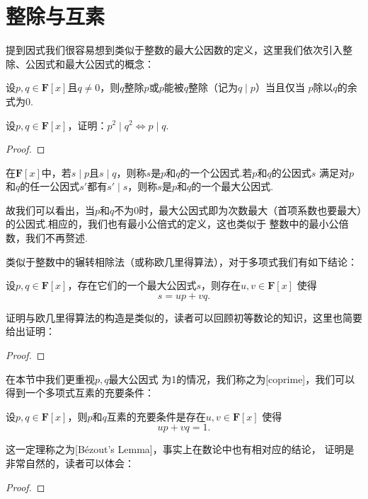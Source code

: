 \section{整除与互素}
提到因式我们很容易想到类似于整数的最大公因数的定义，这里我们依次引入整除、公因式和最大公因式的概念：
\begin{definition}
    设$p,q\in\mathbf{F}[x]$且$q\neq 0$，则$q$整除$p$或$p$能被$q$整除（记为$q \mid p$）当且仅当
    $p$除以$q$的余式为0.
\end{definition}
\begin{example}
    设$p,q\in\mathbf{F}[x]$，证明：$p^2 \mid q^2\iff p \mid q$.
\end{example}
\begin{proof}
    
\end{proof}

\begin{definition}
    在$\mathbf{F}[x]$中，若$s \mid p$且$s \mid q$，则称$s$是$p$和$q$的一个公因式.若$p$和$q$的公因式$s$
    满足对$p$和$q$的任一公因式$s'$都有$s' \mid s$，则称$s$是$p$和$q$的一个最大公因式.
\end{definition}
故我们可以看出，当$p$和$q$不为0时，最大公因式即为次数最大（首项系数也要最大）的公因式.相应的，我们也有最小公倍式的定义，这也类似于
整数中的最小公倍数，我们不再赘述.

类似于整数中的辗转相除法（或称欧几里得算法），对于多项式我们有如下结论：
\begin{theorem}\label{thm:17:欧几里得算法}
    设$p,q\in\mathbf{F}[x]$，存在它们的一个最大公因式$s$，则存在$u,v\in\mathbf{F}[x]$
    使得\[s=up+vq.\]
\end{theorem}
证明与欧几里得算法的构造是类似的，读者可以回顾初等数论的知识，这里也简要给出证明：

\begin{proof}
    
\end{proof}

在本节中我们更重视$p,q$最大公因式
为1的情况，我们称之为[coprime]，我们可以得到一个多项式互素的充要条件：
\begin{theorem}\label{thm:17:裴蜀定理}
    设$p,q\in\mathbf{F}[x]$，则$p$和$q$互素的充要条件是存在$u,v\in\mathbf{F}[x]$
    使得\[up+vq=1.\]
\end{theorem}
这一定理称之为[B\'ezout's Lemma]，事实上在数论中也有相对应的结论，
证明是非常自然的，读者可以体会：

\begin{proof}
    
\end{proof}

